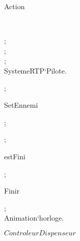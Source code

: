 \begin{op}[e]{Action}%
\signature{() \Oto ()}
\parms{}
\begin{blockstmt}
\If {}
\Then \\
\begin{blockstmt}
 ; \\
 ; \\
 ; \\
SystemeRTP`Pilote.
\end{blockstmt}
\Fi
\end{blockstmt};
\end{op}
\begin{op}[e]{SetEnnemi}%
\signature{\Lp \Lp \Nat  \Mult Controleur`typeMenace \Rp  \Mult \Lp \Int  \Mult \Int  \Mult \Int  \Rp  \Rp  \Oto ()}
\begin{blockstmt}
 ; \\
\end{blockstmt};
\end{op}
\begin{op}[e]{estFini}%
\signature{() \Oto ()}
\parms{}
\Skip ;
\end{op}
\begin{op}[e]{Finir}%
\signature{() \Oto ()}
\parms{}
\end{op}
\kThreadDef
\begin{thread}
\begin{blockstmt}
\begin{while}{\True }
\begin{blockstmt}
 ; \\
Animation`horloge.
\end{blockstmt}
\end{while}
\end{blockstmt}
\end{thread}
\kSync
{}
\kEnd $ControleurDispenseur$

